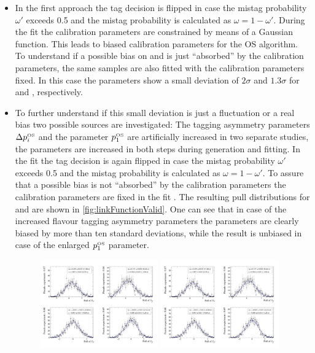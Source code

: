 \begin{itemize}
	\item In the first approach the tag decision is flipped in case the mistag probability $\omega'$ exceeds \num{0.5} and the mistag probability is calculated as $\omega=1-\omega'$.
	During the fit the calibration parameters are constrained by means of a Gaussian function. This leads to biased calibration parameters for the OS algorithm.
	To understand if a possible bias on \Sf and \Sfbar is just \enquote{absorbed} by the calibration parameters, the same samples are also fitted with the calibration parameters fixed.
	In this case the \CP parameters show a small deviation of $2\sigma$ and $1.3\sigma$ for \Sf and \Sfbar, respectively.
	\item To further understand if this small deviation is just a fluctuation or a real bias two possible sources are investigated:
	The tagging asymmetry parameters $\Delta p_i^{\text{\tiny OS}}$ and the parameter $p_1^{\text{\tiny OS}}$ are artificially increased in two separate studies, \ie the parameters are increased in both steps during generation and fitting.
	In the fit the tag decision is again flipped in case the mistag probability $\omega'$ exceeds \num{0.5} and the mistag probability is calculated as $\omega=1-\omega'$.
	To assure that a possible bias is not \enquote{absorbed} by the calibration parameters the calibration parameters are fixed in the fit .
	The resulting pull distributions for \Sf and \Sfbar are shown in \cref{fig:linkFunctionValid}.
	One can see that in case of the increased flavour tagging asymmetry parameters the \CP parameters are clearly biased by more than ten standard deviations, while the result is unbiased in case of the enlarged $p_1^{\text{\tiny OS}}$ parameter.
	\begin{figure}[tbp]
    \centering
    	\includegraphics[width=0.48\textwidth]{09TimeFit/figs/Sf_pull_LinkValid_asym.pdf}
    	\includegraphics[width=0.48\textwidth]{09TimeFit/figs/Sfbar_pull_LinkValid_asym.pdf}\\

\end{figure}
\end{itemize}
